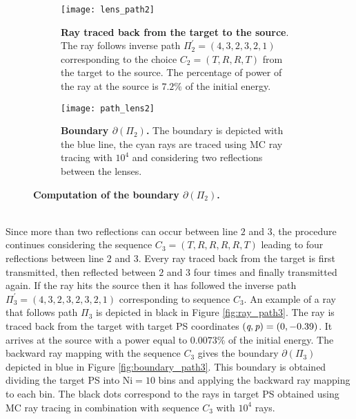 \begin{figure}[t]
\centering
\begin{subfigure}[t]{.45\textwidth}
  \texttt{[image: lens\_path2]}
 \caption{\textbf{Ray traced back from the target to the source}. The ray follows inverse path $\Pi_2^{\prime} = (4,3,2,3,2,1)$ corresponding to the choice $C_2=(T,R,R,T)$ from the target to the source. The percentage of power of the ray at the source is $7.2\%$ of the initial energy.}
  \label{fig:ray_path2}
\end{subfigure}%
\hfill
\begin{subfigure}[t]{.45\textwidth}
  \texttt{[image: path\_lens2]}
  \caption{\textbf{Boundary $\partial$$(\Pi_2)$.} The boundary is depicted with the blue line, the cyan rays are traced using MC ray tracing with $10^4$ and considering two reflections between the lenses.} %
  \label{fig:boundary_path2}
\end{subfigure} %
\caption{\textbf{Computation of the boundary $\partial$$(\Pi_2)$.}}
\end{figure}
\\ \indent Since more than two reflections can occur between line $2$ and $3$, the procedure continues considering the sequence $C_3 = (T,R,R,R,R,T)$ leading to four reflections between line $2$ and $3$. Every ray traced back from the target is first transmitted, then reflected between $2$ and $3$ four times and finally transmitted again. If the ray hits the source then it has followed the inverse path $\Pi_{3}^{\prime} = (4,3,2,3,2,3,2,1)$ corresponding to sequence $C_3$. An example of a ray that follows path $\Pi_3$ is depicted in black in Figure \ref{fig:ray_path3}. The ray is traced back from the target with target PS coordinates $(\textit{q}, \textit{p})=(0,-0.39)$. It arrives at the source with a power equal to $0.0073\%$ of the initial energy. The backward ray mapping with the sequence $C_3$ gives the boundary $\partial$$(\Pi_3)$ depicted in blue in Figure \ref{fig:boundary_path3}. This boundary is obtained dividing the target PS into $\textrm{Ni}=10$ bins and applying the backward ray mapping to each bin. The black dots correspond to the rays in target PS obtained using MC ray tracing in combination with sequence $C_3$ with $10^4$ rays.
